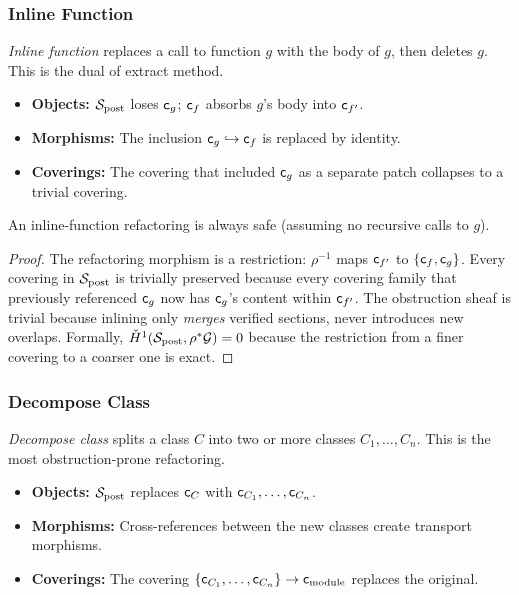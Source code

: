 \documentclass[11pt]{article}
\newcommand{\SitePost}{\Site_{\mathrm{post}}}
\newcommand{\RefactorMorph}{\rho}
\begin{document}
\subsubsection{Inline Function}\label{sssec:inline-function}

\emph{Inline function} replaces a call to function $g$ with the body of
$g$, then deletes $g$.  This is the dual of extract method.

\begin{itemize}[noitemsep]
  \item \textbf{Objects:} $\SitePost$ loses $\mathsf{c}_g$; $\mathsf{c}_f$
        absorbs $g$'s body into $\mathsf{c}_{f'}$.
  \item \textbf{Morphisms:} The inclusion
        $\mathsf{c}_g \hookrightarrow \mathsf{c}_f$ is replaced by identity.
  \item \textbf{Coverings:} The covering that included $\mathsf{c}_g$ as a
        separate patch collapses to a trivial covering.
\end{itemize}

\begin{lemma}\label{lem:inline-safe}
An inline-function refactoring is always safe (assuming no recursive
calls to $g$).
\end{lemma}

\begin{proof}
The refactoring morphism is a restriction: $\RefactorMorph^{-1}$
maps $\mathsf{c}_{f'}$ to $\{\mathsf{c}_f, \mathsf{c}_g\}$.  Every covering in
$\SitePost$ is trivially preserved because every covering family that
previously referenced $\mathsf{c}_g$ now has $\mathsf{c}_g$'s content within
$\mathsf{c}_{f'}$.  The obstruction sheaf is trivial because inlining
only \emph{merges} verified sections, never introduces new overlaps.
Formally, $\check{H}^1(\SitePost, \RefactorMorph^*\mathcal{G}) = 0$
because the restriction from a finer covering to a coarser one is
exact.
\end{proof}

\subsubsection{Decompose Class}\label{sssec:decompose-class}

\emph{Decompose class} splits a class $C$ into two or more classes
$C_1, \ldots, C_n$.  This is the most obstruction-prone refactoring.

\begin{itemize}[noitemsep]
  \item \textbf{Objects:} $\SitePost$ replaces $\mathsf{c}_C$ with
        $\mathsf{c}_{C_1}, \ldots, \mathsf{c}_{C_n}$.
  \item \textbf{Morphisms:} Cross-references between the new classes
        create transport morphisms.
  \item \textbf{Coverings:} The covering
        $\{\mathsf{c}_{C_1}, \ldots, \mathsf{c}_{C_n}\} \to
        \mathsf{c}_{\mathrm{module}}$ replaces the original.
\end{itemize}
\end{document}
